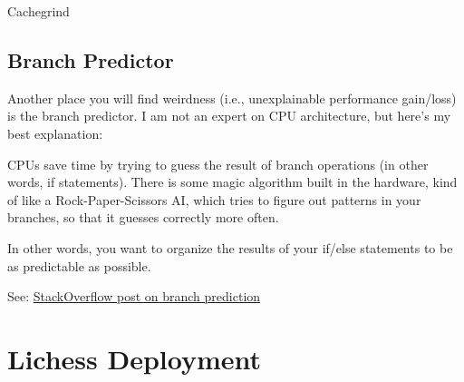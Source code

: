 \documentclass[letterpaper,11pt]{article}
\begin{document}
Cachegrind

\subsection{Branch Predictor}

Another place you will find weirdness (i.e., unexplainable performance gain/loss) is the branch predictor. I am not an 
expert on CPU architecture, but here's my best explanation:

CPUs save time by trying to guess the result of branch operations (in other words, if statements). 
There is some magic algorithm built in the hardware, kind of like a Rock-Paper-Scissors AI, 
which tries to figure out patterns in your branches, so that it guesses correctly more often.

In other words, you want to organize the results of your if/else statements to be as 
predictable as possible.

See: \href{https://stackoverflow.com/questions/11227809/why-is-processing-a-sorted-array-faster-than-processing-an-unsorted-array}{StackOverflow post on branch prediction}

\section{Lichess Deployment}
\end{document}
